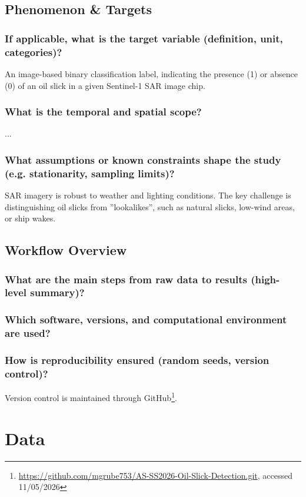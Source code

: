 \documentclass[sigconf]{acmart}
\begin{document}
\subsection{Phenomenon \& Targets}
\subsubsection{If applicable, what is the target variable (definition, unit, categories)?} An image-based binary classification label, indicating the presence (1) or absence (0) of an oil slick in a given Sentinel-1 SAR image chip.
\subsubsection{What is the temporal and spatial scope?} ...
\subsubsection{What assumptions or known constraints shape the study (e.g. stationarity, sampling limits)?} SAR imagery is robust to weather and lighting conditions. The key challenge is distinguishing oil slicks from ''lookalikes'', such as natural slicks, low-wind areas, or ship wakes.

\subsection{Workflow Overview}
\subsubsection{What are the main steps from raw data to results (high-level summary)?}
\subsubsection{Which software, versions, and computational environment are used?}
\subsubsection{How is reproducibility ensured (random seeds, version control)?}
Version control is maintained through GitHub\footnote{\url{https://github.com/mgrube753/AS-SS2026-Oil-Slick-Detection.git}, accessed 11/05/2026}.

\section{Data}
\end{document}
